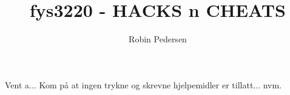 \documentclass{article}
\begin{document}
  \title{fys3220 - HACKS n CHEATS}
  \author{Robin Pedersen}
  \maketitle

  Vent a... Kom på at ingen trykne og skrevne hjelpemidler er tillatt... nvm.
\end{document}
